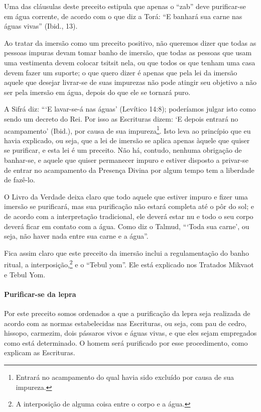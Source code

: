 Uma das cláusulas deste preceito estipula que apenas o ``zab'' deve
purificar-se em água corrente, de acordo com o que diz a Torá: ``E
banhará sua carne nas águas vivas'' (Ibid., 13).

Ao tratar da imersão como um preceito positivo, não queremos dizer que
todas as pessoas impuras devam tomar banho de imersão, que todas
as pessoas que usam uma vestimenta devem colocar tsitsit nela, ou
que todos os que tenham uma casa devem fazer um suporte; o que quero
dizer é apenas que pela lei da imersão aquele que desejar livrar-se de
suas impurezas não pode atingir seu objetivo a não ser pela imersão em
água, depois do que ele se tornará puro.

A Sifrá diz: ```E lavar-se-á nas águas' (Levítico 14:8); poderíamos
julgar isto como sendo um decreto do Rei. Por isso as Escrituras dizem:
`E depois entrará no acampamento' (Ibid.), por causa de sua
impureza\footnote{Entrará no acampamento do qual havia sido excluído por causa de sua
  impureza.}. Isto leva ao princípio que eu havia
explicado, ou seja, que a lei de imersão se aplica apenas àquele que
quiser se purificar, e esta lei é um preceito. Não há, contudo, nenhuma
obrigação de banhar-se, e aquele que quiser permanecer impuro e estiver
disposto a privar-se de entrar no acampamento da Presença Divina por
algum tempo tem a liberdade de fazê-lo.

O Livro da Verdade deixa claro que todo aquele que estiver impuro e
fizer uma imersão se purificará, mas sua purificação não estará completa
até o pôr do sol; e de acordo com a interpretação tradicional, ele
deverá estar nu e todo o seu corpo deverá ficar em contato com a água.
Como diz o Talmud, ```Toda sua carne', ou seja, não haver nada entre sua
carne e a água''.

Fica assim claro que este preceito da imersão inclui a regulamentação
do banho ritual, a interposição,\footnote{A interposição de alguma coisa entre o corpo e a água.} e o ``Tebul
yom''. Ele está explicado nos Tratados Mikvaot e Tebul Yom.

\paragraph{Purificar-se da lepra}

Por este preceito somos ordenados a que a purificação da lepra seja
realizada de acordo com as normas estabelecidas nas Escrituras, ou seja,
com pau de cedro, hissopo, carmezim, dois pássaros vivos e águas vivas,
e que eles sejam empregados como está determinado. O homem será
purificado por esse procedimento, como explicam as Escrituras.

